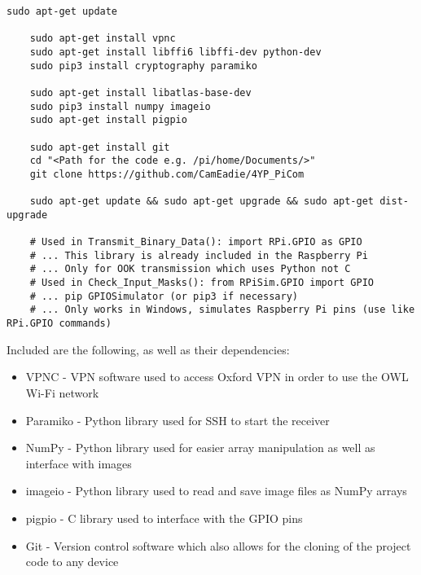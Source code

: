 \documentclass[../main.tex]{subfiles}
\begin{document}
\lstset{style=python}
\begin{lstlisting}[caption=Libraries and Packages Required for the Test Bed]
	sudo apt-get update
	
	sudo apt-get install vpnc
	sudo apt-get install libffi6 libffi-dev python-dev
	sudo pip3 install cryptography paramiko
	
	sudo apt-get install libatlas-base-dev
	sudo pip3 install numpy imageio
	sudo apt-get install pigpio
	
	sudo apt-get install git
	cd "<Path for the code e.g. /pi/home/Documents/>"
	git clone https://github.com/CamEadie/4YP_PiCom

	sudo apt-get update && sudo apt-get upgrade && sudo apt-get dist-upgrade

	# Used in Transmit_Binary_Data(): import RPi.GPIO as GPIO
	# ... This library is already included in the Raspberry Pi
	# ... Only for OOK transmission which uses Python not C
	# Used in Check_Input_Masks(): from RPiSim.GPIO import GPIO
	# ... pip GPIOSimulator (or pip3 if necessary)
	# ... Only works in Windows, simulates Raspberry Pi pins (use like RPi.GPIO commands)
\end{lstlisting}

Included are the following, as well as their dependencies:

\begin{itemize}
	\item VPNC - VPN software used to access Oxford VPN in order to use the OWL Wi-Fi network \cite{lib_VPNC}
	\item Paramiko - Python library used for SSH to start the receiver \cite{lib_Paramiko}
	\item NumPy - Python library used for easier array manipulation as well as interface with images \cite{lib_NumPy}
	\item imageio - Python library used to read and save image files as NumPy arrays \cite{lib_imageio}
	\item pigpio - C library used to interface with the GPIO pins \cite{lib_pigpio}
	\item Git - Version control software which also allows for the cloning of the project code to any device \cite{lib_Git}
\end{itemize}

\clearpage

	
\end{document}
